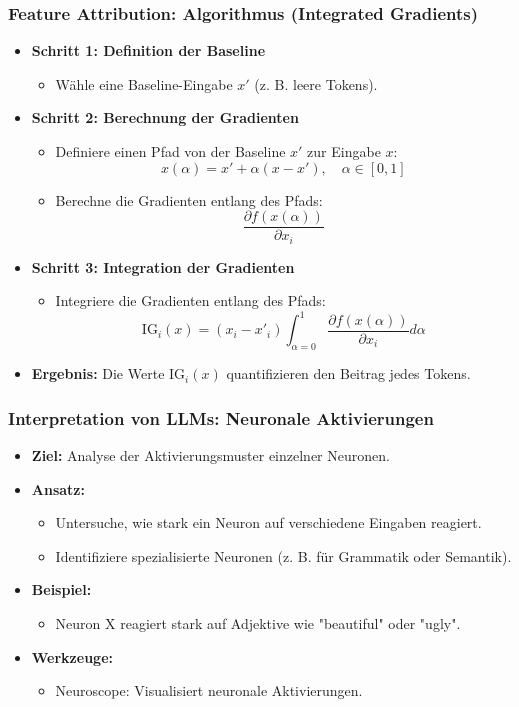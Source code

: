 \documentclass[aspectratio=1610, xcolor=dvipsnames, 9pt]{beamer}
\begin{document}
\begin{frame}
  \frametitle{Feature Attribution: Algorithmus (Integrated Gradients)}
  \begin{itemize}
    \item \textbf{Schritt 1: Definition der Baseline}
    \begin{itemize}
      \item Wähle eine Baseline-Eingabe $x'$ (z. B. leere Tokens).
    \end{itemize}
    \item \textbf{Schritt 2: Berechnung der Gradienten}
    \begin{itemize}
      \item Definiere einen Pfad von der Baseline $x'$ zur Eingabe $x$:
      \[
      x(\alpha) = x' + \alpha (x - x'), \quad \alpha \in [0, 1]
      \]
      \item Berechne die Gradienten entlang des Pfads:
      \[
      \frac{\partial f(x(\alpha))}{\partial x_i}
      \]
    \end{itemize}
    \item \textbf{Schritt 3: Integration der Gradienten}
    \begin{itemize}
      \item Integriere die Gradienten entlang des Pfads:
      \[
      \text{IG}_i(x) = (x_i - x'_i) \int_{\alpha=0}^1 \frac{\partial f(x(\alpha))}{\partial x_i} d\alpha
      \]
    \end{itemize}
    \item \textbf{Ergebnis:} Die Werte $\text{IG}_i(x)$ quantifizieren den Beitrag jedes Tokens.
  \end{itemize}
\end{frame}

\begin{frame}
  \frametitle{Interpretation von LLMs: Neuronale Aktivierungen}
  \begin{itemize}
    \item \textbf{Ziel:} Analyse der Aktivierungsmuster einzelner Neuronen.
    \item \textbf{Ansatz:}
    \begin{itemize}
      \item Untersuche, wie stark ein Neuron auf verschiedene Eingaben reagiert.
      \item Identifiziere spezialisierte Neuronen (z. B. für Grammatik oder Semantik).
    \end{itemize}
    \item \textbf{Beispiel:}
    \begin{itemize}
      \item Neuron X reagiert stark auf Adjektive wie "beautiful" oder "ugly".
    \end{itemize}
    \item \textbf{Werkzeuge:}
    \begin{itemize}
      \item Neuroscope: Visualisiert neuronale Aktivierungen.
    \end{itemize}
  \end{itemize}
\end{frame}
\end{document}
